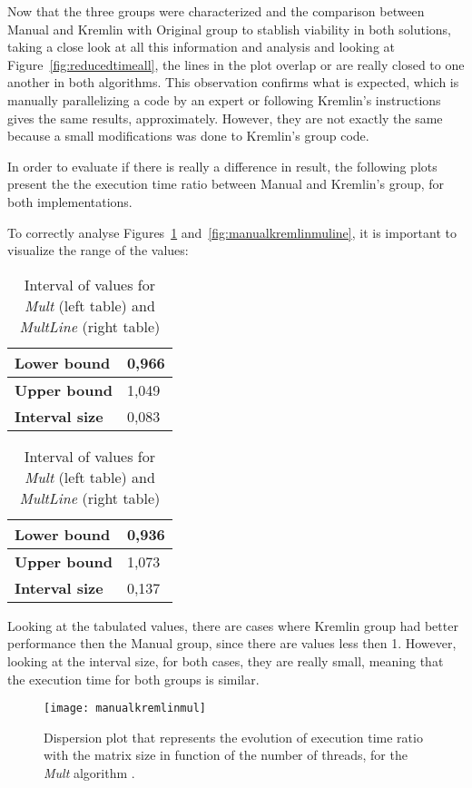 Now that the three groups were characterized and the comparison between Manual and Kremlin with Original group to stablish viability in both solutions, taking a close look at all this information and analysis and looking at Figure~\ref{fig:reducedtimeall}, the lines in the plot overlap or are really closed to one another in both algorithms. This observation confirms what is expected, which is manually parallelizing a code by an expert or following Kremlin's instructions gives the same results, approximately. However, they are not exactly the same because a small modifications was done to Kremlin's group code. 

In order to evaluate if there is really a difference in result, the following plots present the the execution time ratio between Manual and Kremlin's group, for both implementations.

To correctly analyse Figures~\ref{fig:manualkremlinmul} and~\ref{fig:manualkremlinmuline}, it is important to visualize the range of the values:

\begin{table}[htb]
	\centering
	\caption{Interval of values for \textit{Mult} (left table) and \textit{MultLine} (right table)}
	\begin{tabular}{ |l|l| }
		\hline
		\textbf{Lower bound} & 0,966\\ \hline
		\textbf{Upper bound} & 1,049 \\ \hline
		\textbf{Interval size} & 0,083 \\
		\hline
	\end{tabular}
	\quad
	\begin{tabular}{ |l|l| }
		\hline
		\textbf{Lower bound} & 0,936 \\ \hline
		\textbf{Upper bound} & 1,073 \\ \hline
		\textbf{Interval size} & 0,137 \\
		\hline
	\end{tabular}
\end{table}

Looking at the tabulated values, there are cases where Kremlin group had better performance then the Manual group, since there are values less then 1. However, looking at the interval size, for both cases, they are really small, meaning that the execution time for both groups is similar.


\begin{figure}[htb]
	\begin{center}
		\leavevmode
		\texttt{[image: manualkremlinmul]}
		\caption{Dispersion plot that represents the evolution of execution time ratio with the matrix size in function of the number of threads, for the \textit{Mult} algorithm .}
		\label{fig:manualkremlinmul}
	\end{center}
\end{figure}

